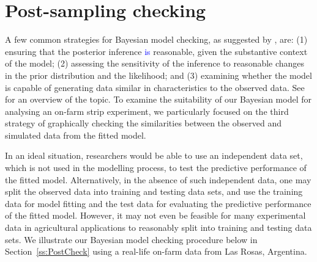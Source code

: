 \documentclass[a4paper]{article}   	%
\begin{document}
	
	
	
	\section{Post-sampling checking}\label{sec:mcmcchain}
	
	
	
	A few common strategies for Bayesian model checking, as suggested by \textcite{gelman2003Bayesian}, are: (1) ensuring that the posterior inference \textcolor{blue}{is} reasonable, given the substantive context of the model; (2) assessing the sensitivity of the inference to reasonable changes in the prior distribution and the likelihood; and (3) examining whether the model is capable of generating data similar in characteristics to the observed data. See \textcite{gelman2004Exploratory, Weiss1994Pediatric, Gelman2013Bayesian, Congdon2019Bayesian} for an overview of the topic. To examine the suitability of our Bayesian model for analysing an on-farm strip experiment, we particularly focused on the third strategy of graphically checking the similarities between the observed and simulated data from the fitted model. 
	
	
	In an ideal situation, researchers would be able to use an independent data set, which is not used in the modelling process, to test the predictive performance of the fitted model. Alternatively, in the absence of such independent data, one may split the observed data into training and testing data sets, and use the training data for model fitting and the test data for evaluating the predictive performance of the fitted model. However, it may not even be feasible for many experimental data in agricultural applications to reasonably split into training and testing data sets. We illustrate our Bayesian model checking procedure below in Section~\ref{ss:PostCheck} using a real-life on-farm data from Las Rosas, Argentina. 
	
\end{document}
